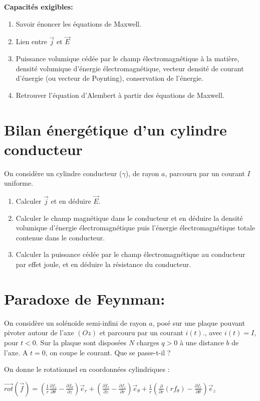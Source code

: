 \documentclass{article}
\begin{document}
\textbf{Capacités exigibles: }

\begin{enumerate}
  \item Savoir énoncer les équations de Maxwell. 
  \item Lien entre $\vec{j}$ et $\vec{E}$
  \item Puissance volumique cédée par le champ électromagnétique à la matière, densité volumique d'énergie électromagnétique, vecteur densité de courant d'énergie (ou vecteur de Poynting), conservation de l'énergie.
  \item Retrouver l'équation d'Alembert à partir des équations de Maxwell.
\end{enumerate}



\section{Bilan énergétique d'un cylindre conducteur}


On considère un cylindre conducteur ($\gamma$), de rayon $a$, parcouru par un courant $I$ uniforme. 
\begin{enumerate}
  \item Calculer $\vec{j}$ et en déduire $\vec{E}$.
  \item Calculer le champ magnétique dans le conducteur et en déduire la densité volumique d'énergie électromagnétique puis l'énergie électromagnétique totale contenue dans le conducteur. 
  \item Calculer la puissance cédée par le champ électromagnétique au conducteur par effet joule, et en déduire la résistance du conducteur. 
\end{enumerate}

\section{Paradoxe de Feynman: }

On considère un solénoïde semi-infini de rayon $a$, posé sur une plaque pouvant pivoter autour de l'axe $(Oz)$ et parcouru par un courant $ i(t).$, avec $i(t) = I$, pour $t<0$.  
Sur la plaque sont disposées $N$ charges $q>0$ à une distance $b$ de l'axe. 
A $t=0$, on coupe le courant. 
Que se passe-t-il ? 

On donne le rotationnel en coordonnées cylindriques :

$\vec{rot}(\vec{f}) = \left( \frac{1}{r} \frac{\partial f_z}{\partial \theta} - \frac{\partial f_\theta}{\partial z} \right) \vec{e}_r 
+ \left( \frac{\partial f_r}{\partial z} - \frac{\partial f_z}{\partial r} \right) \vec{e}_\theta 
+ \frac{1}{r} \left( \frac{\partial}{\partial r}(r f_\theta) - \frac{\partial f_r}{\partial \theta} \right) \vec{e}_z $\\
\end{document}
